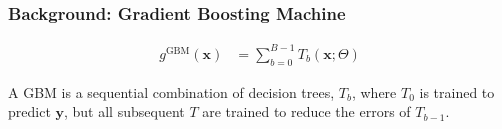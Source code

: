 \documentclass[11pt,aspectratio=169,hyperref={colorlinks}]{beamer}
\begin{document}
\begin{frame}[allowframebreaks]
		\end{frame}
	
		\begin{frame}
		
			\frametitle{Background: Gradient Boosting Machine}			
			
			\begin{equation}
			\begin{aligned}\label{eq:gbm}
			g^{\text{GBM}}(\mathbf{x}) &= \sum_{b=0}^{B-1} T_b\left(\mathbf{x}; \Theta\right)
			\end{aligned}
			\end{equation}
		
			\vspace{20pt}
		
			A GBM is a sequential combination of decision trees, $T_b$, where $T_0$ is trained to predict $\mathbf{y}$, but all subsequent $T$ are trained to reduce the errors of $T_{b-1}$.
		
		\end{frame}	

			
		
\end{document}
